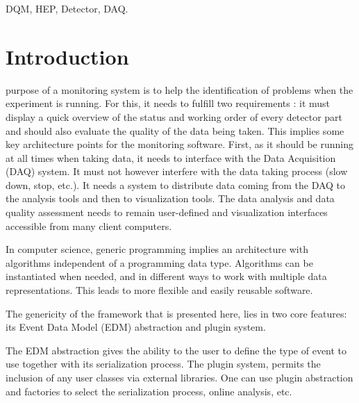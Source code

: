 \documentclass[journal]{IEEEtran}
\begin{document}
\begin{IEEEkeywords}
DQM, HEP, Detector, DAQ.
\end{IEEEkeywords}



\section{Introduction}
%
%
%
%


 purpose of a monitoring system is to help the identification of problems when the experiment is running. For this, it needs to fulfill two requirements : it must display a quick overview of the status and working order of every detector part and should also evaluate the quality of the data being taken. This implies some key architecture points for the monitoring software. First, as it should be running at all times when taking data, it needs to interface with the Data Acquisition (DAQ) system. It must not however interfere with the data taking process (slow down, stop, etc.). It needs a system to distribute data coming from the DAQ to the analysis tools and then to visualization tools. The data analysis and data quality assessment needs to remain user-defined and visualization interfaces accessible from many client computers.

In computer science, generic programming implies an architecture with algorithms independent of a programming data type. Algorithms can be instantiated when needed, and in different ways to work with multiple data representations. This leads to more flexible and easily reusable software.

The genericity of the framework that is presented here, lies in two core features: its Event Data Model (EDM) abstraction and plugin system.

The EDM abstraction gives the ability to the user to define the type of event to use together with its serialization process. The plugin system, permits the inclusion of any user classes via external libraries. One can use plugin abstraction and factories to select the serialization process, online analysis, etc.
\end{document}

